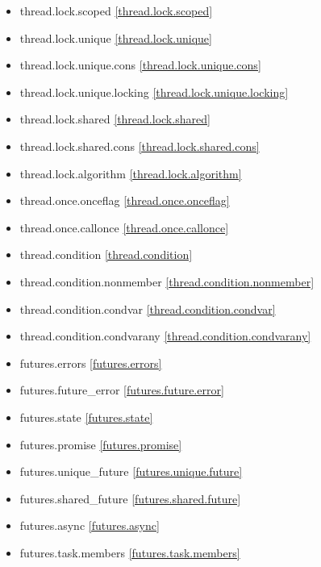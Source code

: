 \begin{multicols}{2}
\begin{itemize}
\item{thread.lock.scoped                    \ref{thread.lock.scoped}}
\item{thread.lock.unique                    \ref{thread.lock.unique}}
\item{thread.lock.unique.cons               \ref{thread.lock.unique.cons}}
\item{thread.lock.unique.locking            \ref{thread.lock.unique.locking}}
\item{thread.lock.shared                    \ref{thread.lock.shared}}
\item{thread.lock.shared.cons               \ref{thread.lock.shared.cons}}
\item{thread.lock.algorithm                 \ref{thread.lock.algorithm}}
\item{thread.once.onceflag                  \ref{thread.once.onceflag}}
\item{thread.once.callonce                  \ref{thread.once.callonce}}
\item{thread.condition                      \ref{thread.condition}}
\item{thread.condition.nonmember            \ref{thread.condition.nonmember}}
\item{thread.condition.condvar              \ref{thread.condition.condvar}}
\item{thread.condition.condvarany           \ref{thread.condition.condvarany}}
\item{futures.errors                        \ref{futures.errors}}
\item{futures.future_error                  \ref{futures.future.error}}
\item{futures.state                         \ref{futures.state}}
\item{futures.promise                       \ref{futures.promise}}
\item{futures.unique_future                 \ref{futures.unique.future}}
\item{futures.shared_future                 \ref{futures.shared.future}}
\item{futures.async                         \ref{futures.async}}
\item{futures.task.members                  \ref{futures.task.members}}

\end{itemize}
\end{multicols}

